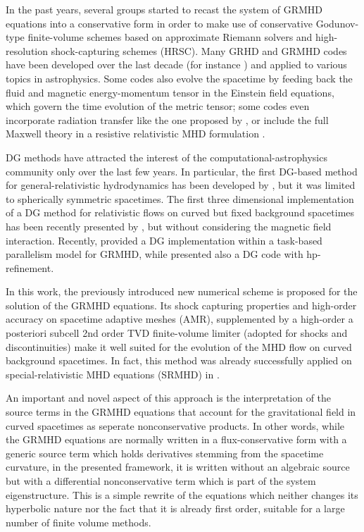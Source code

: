 \begin{fullwidth}
In the past years, several groups
started to recast the system of GRMHD equations into a conservative form
in order
to make use of conservative Godunov-type finite-volume schemes based on
approximate Riemann solvers and high-resolution shock-capturing schemes
(HRSC). Many GRHD and GRMHD codes have been developed over the last
decade (for instance \cite{Baiotti04, Duez05MHD0, Anninos05c, Anton06,
	Giacomazzo:2007ti, Anderson2008, Kiuchi2009, Bucciantini2011,
	Radice2012a, Dionysopoulou:2012pp, Radice2013b, Osorio2015, 
	White2016, 
	Porth2017})
and applied to various topics in astrophysics. Some codes also evolve the
spacetime by feeding back the fluid and magnetic energy-momentum tensor
in the Einstein field equations, which govern the time evolution of the
metric tensor; some codes even incorporate radiation transfer like the
one proposed by \cite{Takahashi2017}, or include the full Maxwell theory
in a resistive relativistic MHD formulation
\cite{Palenzuela:2008sf, Dumbser2009,
	Dionysopoulou:2012pp, Bucciantini2012a, Bugli2014, Aloy2016}.

DG methods have attracted the interest of the computational-astro\-physics
community only over the last few years. In particular, the first
DG-based method for general-relativistic hydrodynamics has been developed
by \cite{Radice2011}, but it was limited to spherically symmetric
spacetimes. The first three dimensional implementation of a DG method for
relativistic flows on curved but fixed background spacetimes has been
recently presented by \cite{Bugner2015}, but without considering the
magnetic field interaction. Recently, \cite{Kidder2016}
provided a DG implementation within a task-based parallelism model for
GRMHD, while \cite{Anninos2017} presented also a DG code with
hp-refinement.

In this work, the previously introduced new numerical scheme is proposed
for the solution of the GRMHD equations. Its
shock capturing properties and high-order accuracy on spacetime
adaptive meshes (AMR), supplemented by a high-order a posteriori
subcell 2nd order TVD finite-volume limiter (adopted for shocks
and discontinuities) make it well suited for the evolution of the MHD
flow on curved background spacetimes. In fact, this method
was already successfully applied on special-relativistic MHD
equations (SRMHD) in \cite{Zanotti2015d}.

An important and novel aspect of this approach is the interpretation of
the source terms in the GRMHD equations that account for the
gravitational field in curved spacetimes as seperate nonconservative
products. In other words, while the GRMHD equations are normally written
in a flux-conservative form with a generic source term which holds
derivatives stemming from the spacetime curvature, in the presented
framework, it is written without an algebraic source but with a
differential nonconservative term which is part of the system
eigenstructure. This is a simple rewrite of the equations which neither
changes its hyperbolic nature  \cite{Anile_book,Komissarov1999} nor the
fact that it is already first order, suitable for a large number of
finite volume methods.


\end{fullwidth}
